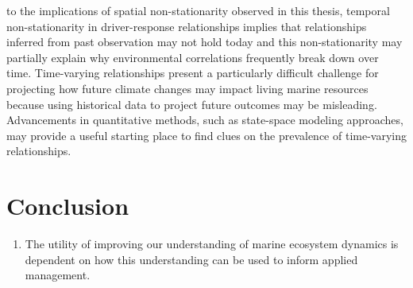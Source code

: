 \begin{enumerate}
  to the implications of spatial non-stationarity observed in this
  thesis, temporal non-stationarity in driver-response relationships
  implies that relationships inferred from past observation may not hold
  today and this non-stationarity may partially explain why
  environmental correlations frequently break down over time.
  Time-varying relationships present a particularly difficult challenge
  for projecting how future climate changes may impact living marine
  resources because using historical data to project future outcomes may
  be misleading. Advancements in quantitative methods, such as
  state-space modeling approaches, may provide a useful starting place
  to find clues on the prevalence of time-varying relationships.
\end{enumerate}

\section{Conclusion}\label{conclusion}

\begin{enumerate}
\def\labelenumi{\arabic{enumi}.}
\setcounter{enumi}{5}
\tightlist
\item
  The utility of improving our understanding of marine ecosystem
  dynamics is dependent on how this understanding can be used to inform
  applied management.
\end{enumerate}
